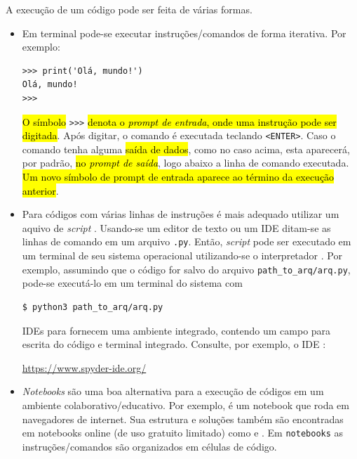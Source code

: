A execução de um código {\python} pode ser feita de várias formas.

\begin{itemize}
\item {}

  Em terminal {\python} pode-se executar instruções/comandos de forma iterativa. Por exemplo:

\begin{lstlisting}[xrightmargin=2.5em]
>>> print('Olá, mundo!')
Olá, mundo!
>>> 
\end{lstlisting}      

  \hl{O símbolo }\lstinline+>>>+\hl{ denota o \emph{prompt de entrada}, onde uma instrução {\python} pode ser digitada}. Após digitar, o comando é executada teclando \lstinline+<ENTER>+. Caso o comando tenha alguma \hl{saída de dados}, como no caso acima, esta aparecerá, por padrão, \hl{no \emph{prompt de saída}}, logo abaixo a linha de comando executada. \hl{Um novo símbolo de prompt de entrada aparece ao término da execução anterior}.

\item {}

  Para códigos com várias linhas de instruções é mais adequado utilizar um aquivo de \textit{script} {\python}. Usando-se um editor de texto ou um IDE ditam-se as linhas de comando em um arquivo \lstinline+.py+. Então, \textit{script} pode ser executado em um terminal de seu sistema operacional utilizando-se o interpretador {\python}. Por exemplo, assumindo que o código for salvo do arquivo \lstinline+path_to_arq/arq.py+, pode-se executá-lo em um terminal do sistema com

\begin{lstlisting}[xrightmargin=2.5em]
$ python3 path_to_arq/arq.py 
\end{lstlisting}%
  

  IDEs para {\python} fornecem uma ambiente integrado, contendo um campo para escrita do código e terminal {\python} integrado. Consulte, por exemplo, o IDE {\spyder}:
  \begin{center}
    \url{https://www.spyder-ide.org/}
  \end{center}

\item {}

  \textit{Notebooks} {\python} são uma boa alternativa para a execução de códigos em um ambiente colaborativo/educativo. Por exemplo, {\jupyter} é um notebook que roda em navegadores de internet. Sua estrutura e soluções também são encontradas em notebooks online (de uso gratuito limitado) como {\colab} e {\kaggle}. Em \texttt{notebooks} as instruções/comandos são organizados em células de código.


\end{itemize}
